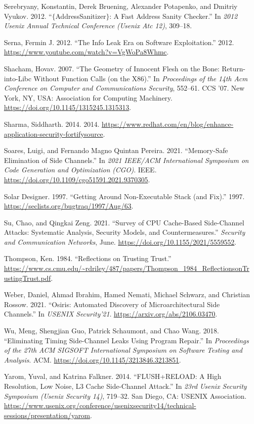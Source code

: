 \documentclass[a4paper,]{report}
\begin{document}
\leavevmode\hypertarget{ref-Serebryany2012}{}%
Serebryany, Konstantin, Derek Bruening, Alexander Potapenko, and Dmitriy
Vyukov. 2012. ``\(\{\)AddressSanitizer\(\}\): A Fast Address Sanity
Checker.'' In \emph{2012 Usenix Annual Technical Conference (Usenix Atc
12)}, 309--18.

\leavevmode\hypertarget{ref-Serna2012}{}%
Serna, Fermin J. 2012. ``The Info Leak Era on Software Exploitation.''
2012. \url{https://www.youtube.com/watch?v=VgWoPa8Whmc}.

\leavevmode\hypertarget{ref-Shacham2007}{}%
Shacham, Hovav. 2007. ``The Geometry of Innocent Flesh on the Bone:
Return-into-Libc Without Function Calls (on the X86).'' In
\emph{Proceedings of the 14th Acm Conference on Computer and
Communications Security}, 552--61. CCS '07. New York, NY, USA:
Association for Computing Machinery.
\url{https://doi.org/10.1145/1315245.1315313}.

\leavevmode\hypertarget{ref-Sharma2014}{}%
Sharma, Siddharth. 2014. 2014.
\url{https://www.redhat.com/en/blog/enhance-application-security-fortifysource}.

\leavevmode\hypertarget{ref-Soares2021}{}%
Soares, Luigi, and Fernando Magno Quintan Pereira. 2021. ``Memory-Safe
Elimination of Side Channels.'' In \emph{2021 IEEE/ACM International
Symposium on Code Generation and Optimization (CGO)}. IEEE.
\url{https://doi.org/10.1109/cgo51591.2021.9370305}.

\leavevmode\hypertarget{ref-Solar1997}{}%
Solar Designer. 1997. ``Getting Around Non-Executable Stack (and Fix).''
1997. \url{https://seclists.org/bugtraq/1997/Aug/63}.

\leavevmode\hypertarget{ref-Su2021}{}%
Su, Chao, and Qingkai Zeng. 2021. ``Survey of CPU Cache-Based
Side-Channel Attacks: Systematic Analysis, Security Models, and
Countermeasures.'' \emph{Security and Communication Networks}, June.
\url{https://doi.org/10.1155/2021/5559552}.

\leavevmode\hypertarget{ref-Thompson1984}{}%
Thompson, Ken. 1984. ``Reflections on Trusting Trust.''
\url{https://www.cs.cmu.edu/~rdriley/487/papers/Thompson_1984_ReflectionsonTrustingTrust.pdf}.

\leavevmode\hypertarget{ref-Weber2021}{}%
Weber, Daniel, Ahmad Ibrahim, Hamed Nemati, Michael Schwarz, and
Christian Rossow. 2021. ``Osiris: Automated Discovery of
Microarchitectural Side Channels.'' In \emph{USENIX Security'21}.
\url{https://arxiv.org/abs/2106.03470}.

\leavevmode\hypertarget{ref-Wu2018}{}%
Wu, Meng, Shengjian Guo, Patrick Schaumont, and Chao Wang. 2018.
``Eliminating Timing Side-Channel Leaks Using Program Repair.'' In
\emph{Proceedings of the 27th ACM SIGSOFT International Symposium on
Software Testing and Analysis}. ACM.
\url{https://doi.org/10.1145/3213846.3213851}.

\leavevmode\hypertarget{ref-Yarom2014}{}%
Yarom, Yuval, and Katrina Falkner. 2014. ``FLUSH+RELOAD: A High
Resolution, Low Noise, L3 Cache Side-Channel Attack.'' In \emph{23rd
Usenix Security Symposium (Usenix Security 14)}, 719--32. San Diego, CA:
USENIX Association.
\url{https://www.usenix.org/conference/usenixsecurity14/technical-sessions/presentation/yarom}.
\end{document}
